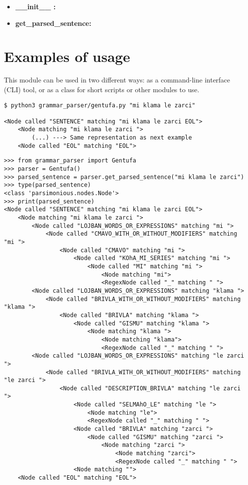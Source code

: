 \begin{itemize}
\item \textbf{\_\_init\_\_ :}
\item \textbf{get\_parsed\_sentence:}
\end{itemize}

\section{Examples of usage}

This module can be used in two different ways: as a command-line interface (CLI) tool, or as a class for short scripts or other modules to use.

\begin{lstlisting}[caption=Gentufa module being used as a command-line interface tool]
$ python3 grammar_parser/gentufa.py "mi klama le zarci"

<Node called "SENTENCE" matching "mi klama le zarci EOL">
    <Node matching "mi klama le zarci ">
        (...) ---> Same representation as next example
    <Node called "EOL" matching "EOL">
\end{lstlisting}

\begin{lstlisting}[caption=Gentufa class being used by a Python script]
>>> from grammar_parser import Gentufa
>>> parser = Gentufa()
>>> parsed_sentence = parser.get_parsed_sentence("mi klama le zarci")
>>> type(parsed_sentence)
<class 'parsimonious.nodes.Node'>
>>> print(parsed_sentence)
<Node called "SENTENCE" matching "mi klama le zarci EOL">
    <Node matching "mi klama le zarci ">
        <Node called "LOJBAN_WORDS_OR_EXPRESSIONS" matching "mi ">
            <Node called "CMAVO_WITH_OR_WITHOUT_MODIFIERS" matching "mi ">
                <Node called "CMAVO" matching "mi ">
                    <Node called "KOhA_MI_SERIES" matching "mi ">
                        <Node called "MI" matching "mi ">
                            <Node matching "mi">
                            <RegexNode called "_" matching " ">
        <Node called "LOJBAN_WORDS_OR_EXPRESSIONS" matching "klama ">
            <Node called "BRIVLA_WITH_OR_WITHOUT_MODIFIERS" matching "klama ">
                <Node called "BRIVLA" matching "klama ">
                    <Node called "GISMU" matching "klama ">
                        <Node matching "klama ">
                            <Node matching "klama">
                            <RegexNode called "_" matching " ">
        <Node called "LOJBAN_WORDS_OR_EXPRESSIONS" matching "le zarci ">
            <Node called "BRIVLA_WITH_OR_WITHOUT_MODIFIERS" matching "le zarci ">
                <Node called "DESCRIPTION_BRIVLA" matching "le zarci ">
                    <Node called "SELMAhO_LE" matching "le ">
                        <Node matching "le">
                        <RegexNode called "_" matching " ">
                    <Node called "BRIVLA" matching "zarci ">
                        <Node called "GISMU" matching "zarci ">
                            <Node matching "zarci ">
                                <Node matching "zarci">
                                <RegexNode called "_" matching " ">
                    <Node matching "">
    <Node called "EOL" matching "EOL">
\end{lstlisting}